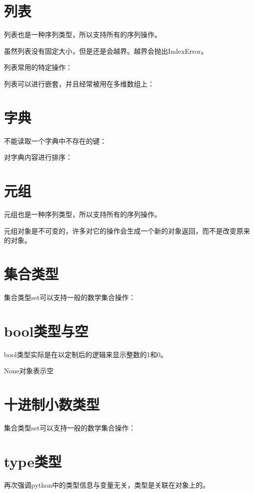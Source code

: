 		

	\section{列表}

		列表也是一种序列类型，所以支持所有的序列操作。

		虽然列表没有固定大小，但是还是会越界。越界会抛出IndexError。
		
		列表常用的特定操作：

		

		列表可以进行嵌套，并且经常被用在多维数组上：

		

	\section{字典}

		不能读取一个字典中不存在的键：

		

		对字典内容进行排序：

		

	\section{元组}

		元组也是一种序列类型，所以支持所有的序列操作。

		元组对象是不可变的，许多对它的操作会生成一个新的对象返回，而不是改变原来的对象。

		
		
	\section{集合类型}

		集合类型set可以支持一般的数学集合操作：

		
		
	\section{bool类型与空}

		bool类型实际是在以定制后的逻辑来显示整数的1和0。

		None对象表示空
		
		


	\section{十进制小数类型}

		集合类型set可以支持一般的数学集合操作：

		

	\section{type类型}

		再次强调python中的类型信息与变量无关，类型是关联在对象上的。

		
